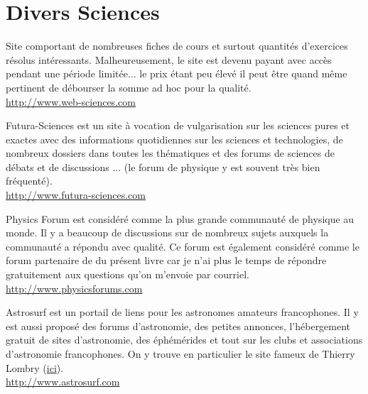 	\pagebreak
	\section{Divers Sciences}

	{\Large {}}{\Large {}}{\Large {}}{\Large {}}\bcdfrance{} Site comportant de nombreuses fiches de cours et surtout quantités d'exercices résolus intéressants. Malheureusement, le site est devenu payant avec accès pendant une période limitée... le prix étant peu élevé il peut être quand même pertinent de débourser la somme ad hoc pour la qualité.\\
	\href{http://www.web-sciences.com}{\color{blue}http://www.web-sciences.com}
	
	{\Large {}}{\Large {}}{\Large {}}{\Large {}}{\Large {}}\bcdfrance{} Futura-Sciences est un site à vocation de vulgarisation sur les sciences pures et exactes avec des informations quotidiennes sur les sciences et technologies, de nombreux dossiers dans toutes les thématiques et des forums de sciences de débats et de discussions ... (le forum de physique y est souvent très bien fréquenté).\\
	\href{http://www.futura-sciences.com}{\color{blue}http://www.futura-sciences.com}
	
	{\Large {}}{\Large {}}{\Large {}}{\Large {}}{\Large {}}\bcdfrance{} Physics Forum est considéré comme la plus grande communauté de physique au monde. Il y a beaucoup de discussions sur de nombreux sujets auxquels la communauté a répondu avec qualité. Ce forum est également considéré comme le forum partenaire de du présent livre car je n'ai plus le temps de répondre gratuitement aux questions qu'on m'envoie par courriel.\\
	\href{http://www.physicsforums.com}{\color{blue}http://www.physicsforums.com}
	
	{\Large {}}{\Large {}}{\Large {}}{\Large {}}{\Large {}}{\Large {}}{\Large {}}{\Large {}}\bcdfrance{} Astrosurf est un portail de liens pour les astronomes amateurs francophones. Il y est aussi proposé des forums d'astronomie, des petites annonces, l'hébergement gratuit de sites d'astronomie, des éphémérides et tout sur les clubs et associations d'astronomie francophones. On y trouve en particulier le site fameux de Thierry Lombry (\href{http://astrosurf.com/luxorion/}{\color{blue}ici}).\\
	\href{http://www.astrosurf.com}{\color{blue}http://www.astrosurf.com}
	
